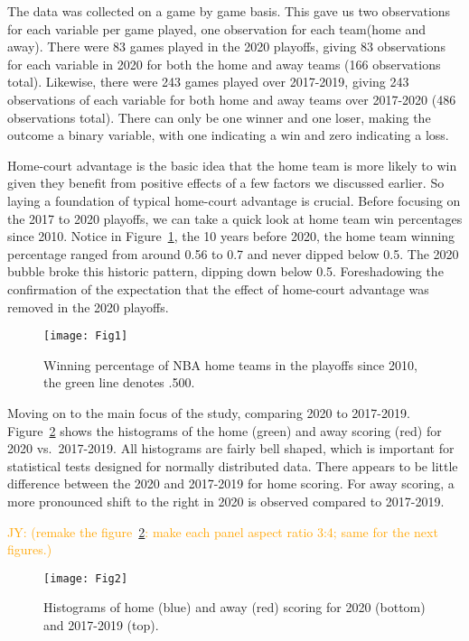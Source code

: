 \documentclass[10pt]{article}
\newcommand{\jy}[1]{\textcolor{orange}{JY: (#1)}}
\begin{document}
The data was collected on a game by game basis. This gave us two observations
for each variable per game played, one observation for each team(home and away).
There were 83 games played in the 2020 playoffs, giving 83 observations
for each variable in 2020 for both the home and away teams (166 observations total).
Likewise, there were 243 games played over 2017-2019, giving 243 observations of each variable
for both home and away teams over 2017-2020 (486 observations total).
 There can only be
one winner and one loser, making the outcome a binary variable, with
one indicating a win and zero indicating a loss.

Home-court advantage is the basic idea that the home team is more likely to win given 
they benefit from positive effects of a few factors we discussed earlier.
So laying a foundation of typical home-court advantage is crucial. Before
focusing on the 2017 to 2020 playoffs, we can take a quick look at home team win
percentages since 2010. Notice in Figure~\ref{fig:Fig1}, the 10 years before 2020, the home team
winning percentage ranged from around 0.56 to 0.7 and never dipped below 0.5. The
2020 bubble broke this historic pattern, dipping down below 0.5. Foreshadowing
the confirmation of the expectation that the effect of home-court advantage was removed
in the 2020 playoffs.

\begin{figure}[tbp]
  \centering
  \texttt{[image: Fig1]}
  \caption{Winning percentage of NBA home teams in the playoffs since
    2010, the green line denotes .500.}
  \label{fig:Fig1}
\end{figure}

Moving on to the main focus of the study, comparing 2020 to 2017-2019.
Figure~\ref{fig:Fig2} shows the histograms of the home (green) and
away scoring (red) for 2020 vs.~2017-2019. All histograms are
fairly bell shaped, which is important for statistical tests
designed for normally distributed data. There appears to be little
difference between the 2020 and 2017-2019 for home scoring. For
away scoring, a more pronounced shift to the right in 2020 is observed
compared to 2017-2019.


\jy{remake the figure~\ref{fig:Fig2}: make each panel aspect ratio 3:4; same for the
  next figures.}

\begin{figure}[tbp]
  \centering
  \texttt{[image: Fig2]}
  \caption{Histograms of home (blue) and away (red) scoring
    for 2020 (bottom) and 2017-2019 (top).}
  \label{fig:Fig2}
\end{figure}
\end{document}
